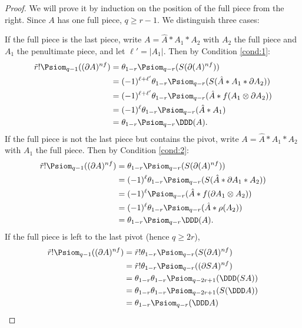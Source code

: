 \begin{proof}
	We will prove it by induction on the position of the full piece from the right. Since $A$ has one full piece, $q\geq r-1$. We distinguish three cases:

	If the full piece is the last piece, write $A=\hat{A}*A_1*A_2$ with $A_2$ the full piece and $A_1$ the penultimate piece, and let $\ell' = |A_1|$. Then by Condition \eqref{cond:1}: 
	\begin{align*}
	    \tilde{r}!\Psiom_{q-1}((\partial A)^{nf}) &=
		\theta_{1-r}\Psiom_{q-r}(S(\partial(A)^{nf})) \\
		&= (-1)^{\ell+\ell'} \theta_{1-r}\Psiom_{q-r}(S(\hat{A}*A_1*\partial A_2)) \\
		&= (-1)^{\ell+\ell'} \theta_{1-r}\Psiom_{q-r}(\hat{A}*f(A_1\otimes \partial A_2)) \\
		&= (-1)^{\ell} \theta_{1-r}\Psiom_{q-r}(\hat{A}*A_1) \\
		&= \theta_{1-r}\Psiom_{q-r}\DDD(A).
	\end{align*}
	If the full piece is not the last piece but contains the pivot, write $A=\hat{A}*A_1*A_2$ with $A_1$ the full piece. Then by Condition \eqref{cond:2}:
	\begin{align*}
	    \tilde{r}!\Psiom_{q-1}((\partial A)^{nf}) &=
        \theta_{1-r}\Psiom_{q-r}(S(\partial(A)^{nf})) \\
        &= (-1)^{\ell}\theta_{1-r}\Psiom_{q-r}(S(\hat{A}*\partial A_1* A_2)) \\
		&= (-1)^{\ell} \Psiom_{q-r}(\hat{A}*f(\partial A_1\otimes A_2)) \\
		&= (-1)^{\ell} \theta_{1-r}\Psiom_{q-r}(\hat{A}*\rho(A_2)) \\
		&= \theta_{1-r}\Psiom_{q-r}\DDD(A).
	\end{align*}
	If the full piece is left to the last pivot (hence $q\geq 2r$), %
    \begin{align*}
        \tilde{r}!\Psiom_{q-1}((\partial A)^{nf}) 
        &= \tilde{r}!\theta_{1-r} \Psiom_{q-r}(S(\partial A)^{nf}) \\
        &= \tilde{r}!\theta_{1-r} \Psiom_{q-r}((\partial SA)^{nf}) \\
        &= \theta_{1-r}\theta_{1-r} \Psiom_{q-2r+1}(\DDD (SA)) \\
        &= \theta_{1-r}\theta_{1-r} \Psiom_{q-2r+1}(S(\DDD A)) \\
        &= \theta_{1-r} \Psiom_{q-r}(\DDD A)
    \end{align*}
\end{proof}

